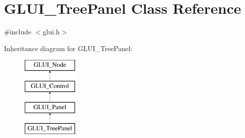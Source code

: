 \hypertarget{classGLUI__TreePanel}{\section{G\-L\-U\-I\-\_\-\-Tree\-Panel Class Reference}
\label{classGLUI__TreePanel}
}


{\ttfamily \#include $<$glui.\-h$>$}

Inheritance diagram for G\-L\-U\-I\-\_\-\-Tree\-Panel\-:\begin{figure}[H]
\begin{center}
\leavevmode
\includegraphics[height=4.000000cm]{classGLUI__TreePanel}
\end{center}
\end{figure}
